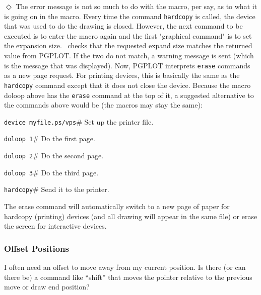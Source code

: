 \indent$\Diamond$
The error message is not so much to do with the macro, per say, as
to what it is going on in the macro.  Every time the command
{\tt hardcopy} is called,
the device that was used to do the drawing is closed.
However, the
next command to be executed is to enter the macro again and the first
"graphical command" is to set the expansion size.
\wip\ checks that the requested expand size matches the returned value
from PGPLOT.
If the two do not match, a warning message is sent
(which is the message that was displayed).
Now, PGPLOT interprets {\tt erase} commands as a new page request.
For printing devices, this is basically the same as the {\tt hardcopy}
command except that it does not close the device.
Because the macro doloop above
has the {\tt erase} command at the top of it,
a suggested alternative to the commands above would be
(the macros may stay the same):
\begin{wiplist}%
  \item {\tt device myfile.ps/vps}\hfill\# Set up the printer file.
\samepage
  \item {\tt doloop 1}\hfill\# Do the first page.
  \item {\tt doloop 2}\hfill\# Do the second page.
  \item {\tt doloop 3}\hfill\# Do the third page.
  \item {\tt hardcopy}\hfill\# Send it to the printer.
\end{wiplist}
The erase command will automatically switch to a new page of paper for
hardcopy (printing) devices (and all drawing will appear in the same file)
or erase the screen for interactive devices.

\subsubsection*         {Offset Positions}

I often need an offset to move away from my current position.
Is there (or can there be) a command like ``shift'' that moves
the pointer relative to the previous move or draw end position?


